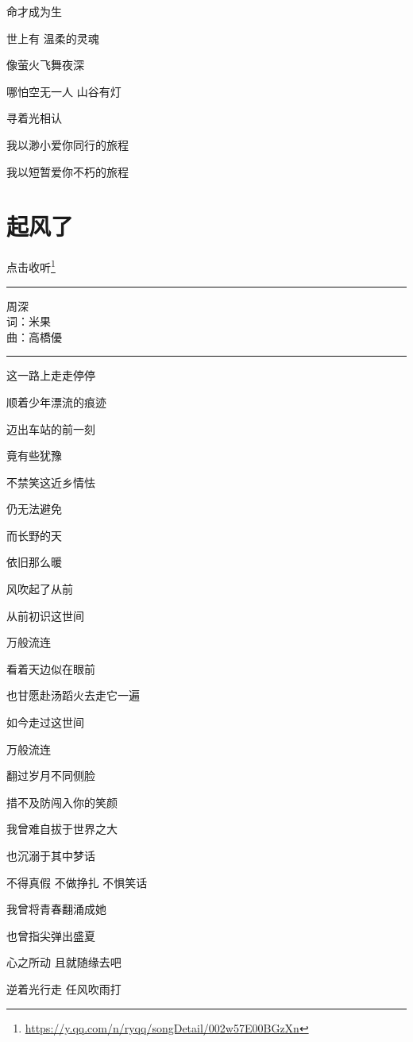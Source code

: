 \documentclass[]{ctexbook}
\renewcommand{\href}[2]{#2\footnote{\url{#1}}}
\begin{document}
命才成为生

世上有 温柔的灵魂

像萤火飞舞夜深

哪怕空无一人 山谷有灯

寻着光相认

我以渺小爱你同行的旅程

我以短暂爱你不朽的旅程

\section*{起风了}\label{the-wind-rises}


\href{https://y.qq.com/n/ryqq/songDetail/002w57E00BGzXn}{点击收听}

\begin{center}\rule{0.5\linewidth}{0.5pt}\end{center}

周深\\
词：米果\\
曲：高橋優

\begin{center}\rule{0.5\linewidth}{0.5pt}\end{center}

这一路上走走停停

顺着少年漂流的痕迹

迈出车站的前一刻

竟有些犹豫

不禁笑这近乡情怯

仍无法避免

而长野的天

依旧那么暖

风吹起了从前

从前初识这世间

万般流连

看着天边似在眼前

也甘愿赴汤蹈火去走它一遍

如今走过这世间

万般流连

翻过岁月不同侧脸

措不及防闯入你的笑颜

我曾难自拔于世界之大

也沉溺于其中梦话

不得真假 不做挣扎 不惧笑话

我曾将青春翻涌成她

也曾指尖弹出盛夏

心之所动 且就随缘去吧

逆着光行走 任风吹雨打
\end{document}
